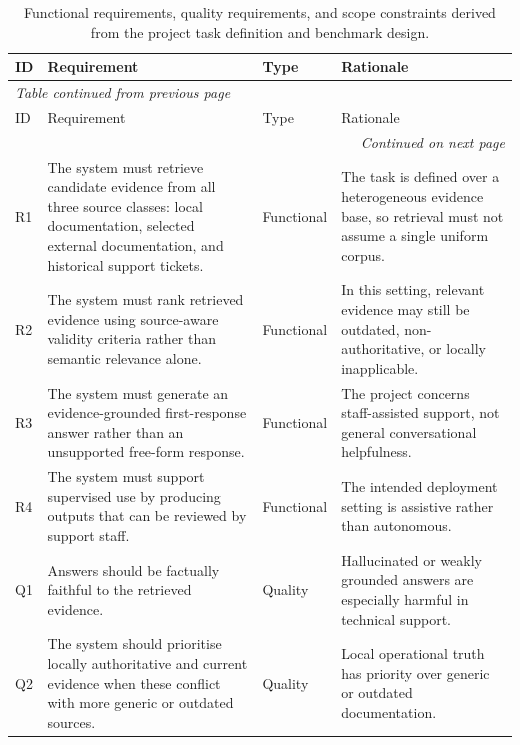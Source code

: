 \begin{longtable}{p{0.9cm} p{5.9cm} p{1.8cm} p{4.7cm}}
\caption{Functional requirements, quality requirements, and scope constraints derived from the project task definition and benchmark design.}
\label{tab:requirements-and-constraints} \\

\hline
ID & Requirement & Type & Rationale \\
\hline
\endfirsthead

\multicolumn{4}{l}{\textit{Table \thetable{} continued from previous page}} \\
\hline
ID & Requirement & Type & Rationale \\
\hline
\endhead

\hline
\multicolumn{4}{r}{\textit{Continued on next page}} \\
\endfoot

\hline
\endlastfoot

R1 & The system must retrieve candidate evidence from all three source classes: local documentation, selected external documentation, and historical support tickets. & Functional & The task is defined over a heterogeneous evidence base, so retrieval must not assume a single uniform corpus. \\

R2 & The system must rank retrieved evidence using source-aware validity criteria rather than semantic relevance alone. & Functional & In this setting, relevant evidence may still be outdated, non-authoritative, or locally inapplicable. \\

R3 & The system must generate an evidence-grounded first-response answer rather than an unsupported free-form response. & Functional & The project concerns staff-assisted support, not general conversational helpfulness. \\

R4 & The system must support supervised use by producing outputs that can be reviewed by support staff. & Functional & The intended deployment setting is assistive rather than autonomous. \\

Q1 & Answers should be factually faithful to the retrieved evidence. & Quality & Hallucinated or weakly grounded answers are especially harmful in technical support. \\

Q2 & The system should prioritise locally authoritative and current evidence when these conflict with more generic or outdated sources. & Quality & Local operational truth has priority over generic or outdated documentation. \\


\end{longtable}
